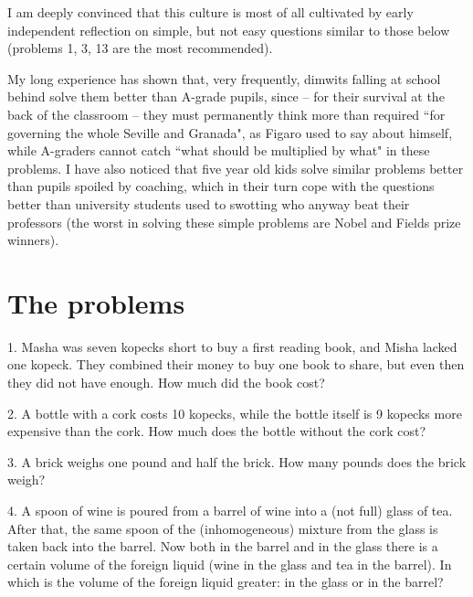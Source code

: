 I am deeply convinced that this culture is most of all cultivated by early independent reflection
on simple, but not easy questions similar to those below (problems 1, 3, 13 are the most recommended).

My long experience has shown that, very frequently, dimwits falling at school behind solve them better
than A-grade pupils, since -- for their survival at the back of the classroom -- they must permanently
think more than required ``for governing the whole Seville and Granada", as Figaro used to say about
himself, while A-graders cannot catch ``what should be multiplied by what" in these problems.
I have also noticed that five year old kids solve similar problems better than pupils spoiled
by coaching, which in their turn cope with the questions better than university students used
to swotting who anyway beat their professors (the worst in solving these simple problems are
Nobel and Fields prize winners).   


\clearpage
\section*{The problems}
\begin{problem}{1.}
	Masha was seven kopecks short to buy a first reading book, and Misha lacked one kopeck.
	They combined their money to buy one book to share, but even then they did not have enough.
	How much did the book cost?
\end{problem}

\begin{problem}{2.}
	A bottle with a cork costs 10 kopecks, while the bottle itself is 9 kopecks more expensive
	than the cork. How much does the bottle without the cork cost?
\end{problem}

\begin{problem}{3.}
	A brick weighs one pound and half the brick. How many pounds does the brick weigh?
\end{problem}

\begin{problem}{4.}
	A spoon of wine is poured from a barrel of wine into a (not full) glass of tea.
	After that, the same spoon of the (inhomogeneous) mixture from the glass is taken back into the barrel.
	Now both in the barrel and in the glass there is a certain volume of the foreign liquid (wine in the glass and
	tea in the barrel). In which is the volume of the foreign liquid greater: in the glass or in the barrel?
\end{problem}

